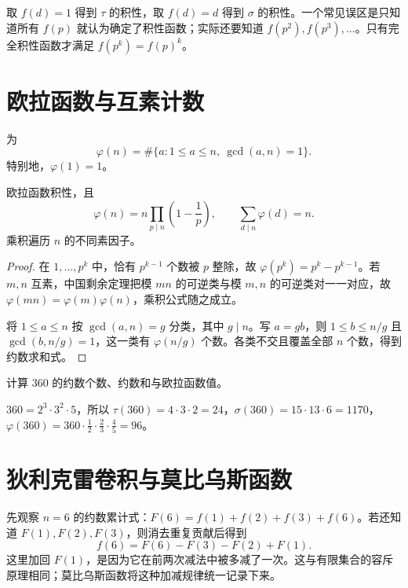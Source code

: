 \documentclass[UTF8,12pt,a4paper,fontset=fandol]{ctexbook}
\begin{document}
取 $f(d)=1$ 得到 $\tau$ 的积性，取 $f(d)=d$ 得到 $\sigma$ 的积性。一个常见误区是只知道所有 $f(p)$ 就认为确定了积性函数；实际还要知道 $f(p^2),f(p^3),\ldots$。只有完全积性函数才满足 $f(p^k)=f(p)^k$。

\section{欧拉函数与互素计数}

\begin{definition}
为
\[
 \varphi(n)=\#\{a:1\le a\le n,\ \gcd(a,n)=1\}.
\]
特别地，$\varphi(1)=1$。
\end{definition}

\begin{theorem}
\label{thm:totient}
欧拉函数积性，且
\begin{equation}
 \varphi(n)=n\prod_{p\mid n}\left(1-\frac1p\right),
 \qquad \sum_{d\mid n}\varphi(d)=n.
 \label{eq:totient-product}
\end{equation}
乘积遍历 $n$ 的不同素因子。
\end{theorem}
\begin{proof}
在 $1,\ldots,p^k$ 中，恰有 $p^{k-1}$ 个数被 $p$ 整除，故 $\varphi(p^k)=p^k-p^{k-1}$。若 $m,n$ 互素，中国剩余定理把模 $mn$ 的可逆类与模 $m,n$ 的可逆类对一一对应，故 $\varphi(mn)=\varphi(m)\varphi(n)$，乘积公式随之成立。

将 $1\le a\le n$ 按 $\gcd(a,n)=g$ 分类，其中 $g\mid n$。写 $a=gb$，则 $1\le b\le n/g$ 且 $\gcd(b,n/g)=1$，这一类有 $\varphi(n/g)$ 个数。各类不交且覆盖全部 $n$ 个数，得到约数求和式。
\end{proof}

\begin{example}
计算 $360$ 的约数个数、约数和与欧拉函数值。
\end{example}
\begin{solve}
$360=2^3\cdot3^2\cdot5$，所以 $\tau(360)=4\cdot3\cdot2=24$，$\sigma(360)=15\cdot13\cdot6=1170$，$\varphi(360)=360\cdot\frac12\cdot\frac23\cdot\frac45=96$。
\end{solve}

\section{狄利克雷卷积与莫比乌斯函数}

先观察 $n=6$ 的约数累计式：$F(6)=f(1)+f(2)+f(3)+f(6)$。若还知道 $F(1),F(2),F(3)$，则消去重复贡献后得到
\[
 f(6)=F(6)-F(3)-F(2)+F(1).
\]
这里加回 $F(1)$，是因为它在前两次减法中被多减了一次。这与有限集合的容斥原理相同；莫比乌斯函数将这种加减规律统一记录下来。
\end{document}
